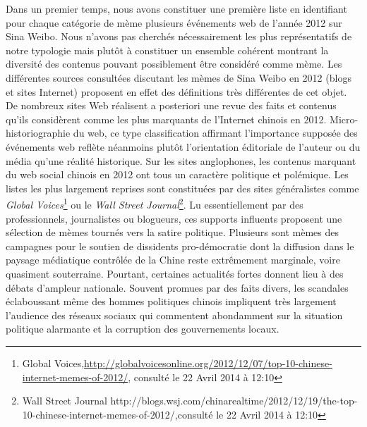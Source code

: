Dans un premier temps, nous avons constituer une première liste en identifiant pour chaque catégorie de mème plusieurs événements web de l{\textquoteright}année 2012 sur Sina Weibo. Nous n'avons pas cherchés nécessairement les plus représentatifs de notre typologie mais plutôt à constituer un ensemble cohérent montrant la diversité des contenus pouvant possiblement être considéré comme mème. Les différentes sources consultées discutant les mèmes de Sina Weibo en 2012 (blogs et sites Internet) proposent en effet des définitions très différentes de cet objet. De nombreux sites Web réalisent a posteriori une revue des faits et contenus qu'ils considèrent comme les plus marquants de l'Internet chinois en 2012. Micro-historiographie du web, ce type classification affirmant l'importance supposée des événements web reflète néanmoins plutôt l'orientation éditoriale de l'auteur ou du média qu'une réalité historique. Sur les sites anglophones, les contenus marquant du web social chinois en 2012 ont tous un caractère politique et polémique. Les  listes les plus largement reprises sont constituées par des sites généralistes comme \textit{Global Voices}\footnote{Global Voices,\url{http://globalvoicesonline.org/2012/12/07/top-10-chinese-internet-memes-of-2012/}, consulté le 22 Avril 2014 à 12:10} ou le \textit{Wall Street Journal}\footnote{ Wall Street Journal http://blogs.wsj.com/chinarealtime/2012/12/19/the-top-10-chinese-internet-memes-of-2012/,consulté le 22 Avril 2014 à 12:10}. Lu essentiellement par des professionnels, journalistes ou blogueurs, ces supports influents proposent une sélection de mèmes tournés vers la satire politique. Plusieurs sont mèmes des campagnes pour le soutien de dissidents pro-démocratie dont la diffusion dans le paysage médiatique contrôlée de la Chine reste extrêmement marginale, voire quasiment souterraine. Pourtant, certaines actualités fortes donnent lieu à des débats d'ampleur nationale. Souvent promues par des faits divers, les scandales éclaboussant même des hommes politiques chinois impliquent très largement l'audience des réseaux sociaux qui commentent abondamment sur la situation politique alarmante et la corruption des gouvernements locaux. 

